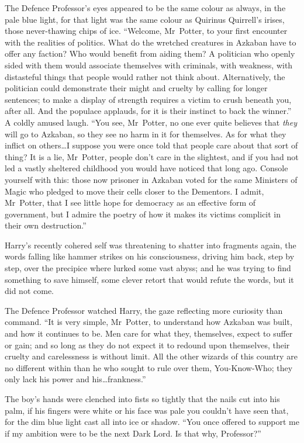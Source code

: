The Defence Professor’s eyes appeared to be the same colour as always, in the pale blue light, for that light was the same colour as Quirinus Quirrell’s irises, those never-thawing chips of ice. “Welcome, Mr~Potter, to your first encounter with the realities of politics. What do the wretched creatures in Azkaban have to offer any faction? Who would benefit from aiding them? A politician who openly sided with them would associate themselves with criminals, with weakness, with distasteful things that people would rather not think about. Alternatively, the politician could demonstrate their might and cruelty by calling for longer sentences; to make a display of strength requires a victim to crush beneath you, after all. And the populace applauds, for it is their instinct to back the winner.” A coldly amused laugh. “You see, Mr~Potter, no one ever quite believes that \emph{they} will go to Azkaban, so they see no harm in it for themselves. As for what they inflict on others…I suppose you were once told that people care about that sort of thing? It is a lie, Mr~Potter, people don’t care in the slightest, and if you had not led a vastly sheltered childhood you would have noticed that long ago. Console yourself with this: those now prisoner in Azkaban voted for the same Ministers of Magic who pledged to move their cells closer to the Dementors. I admit, Mr~Potter, that I see little hope for democracy as an effective form of government, but I admire the poetry of how it makes its victims complicit in their own destruction.”

Harry’s recently cohered self was threatening to shatter into fragments again, the words falling like hammer strikes on his consciousness, driving him back, step by step, over the precipice where lurked some vast abyss; and he was trying to find something to save himself, some clever retort that would refute the words, but it did not come.

The Defence Professor watched Harry, the gaze reflecting more curiosity than command. “It is very simple, Mr~Potter, to understand how Azkaban was built, and how it continues to be. Men care for what they, themselves, expect to suffer or gain; and so long as they do not expect it to redound upon themselves, their cruelty and carelessness is without limit. All the other wizards of this country are no different within than he who sought to rule over them, You-Know-Who; they only lack his power and his…frankness.”

The boy’s hands were clenched into fists so tightly that the nails cut into his palm, if his fingers were white or his face was pale you couldn’t have seen that, for the dim blue light cast all into ice or shadow. “You once offered to support me if my ambition were to be the next Dark Lord. Is that why, Professor?”

